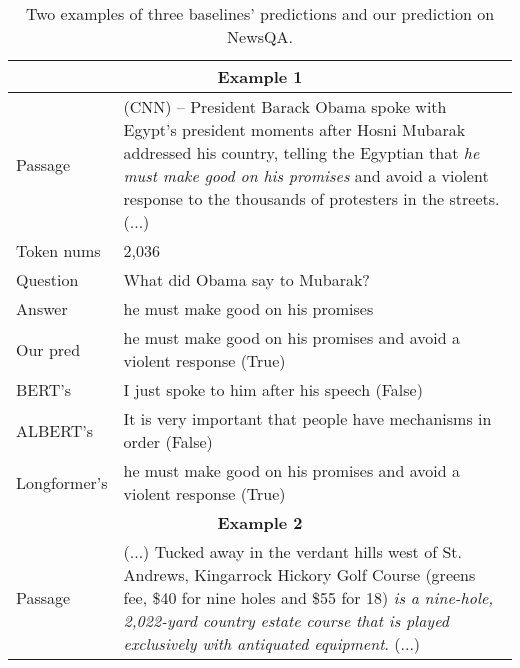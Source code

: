 \begin{table}[]
    \centering
    \caption{Two examples of three baselines' predictions and our prediction on NewsQA.}
    \begin{tabular}{p{56pt}|p{280pt}}
         \hline
         \multicolumn{2}{c}{\bfseries Example 1} \\
         \hline
         Passage & (CNN) -- President Barack Obama spoke with Egypt's president moments after Hosni Mubarak addressed his country, telling the Egyptian that \textcolor[rgb]{1,0,0.2}{\itshape he must make good on his promises} and avoid a violent response to the thousands of protesters in the streets. (...) \\
         \hline
         Token nums & 2,036 \\
         \hline
         Question & What did Obama say to Mubarak? \\
         \hline
         Answer & he must make good on his promises \\
         \hline
         Our pred & \textcolor[rgb]{1,0.4,0.3}{he must make good on his promises and avoid a violent response (True)} \\
         \hline
         BERT's & \textcolor[rgb]{0.4,0.7,0.9}{I just spoke to him after his speech (False)} \\
         \hline
         ALBERT's & \textcolor[rgb]{0.4,0.7,0.9}{It is very important that people have mechanisms in order (False)} \\
         \hline
         Longformer's & \textcolor[rgb]{0.4,0.7,0.9}{he must make good on his promises and avoid a violent response (True)} \\
         \hline
         \hline
         \multicolumn{2}{c}{\bfseries Example 2} \\
         \hline
         Passage & (...) Tucked away in the verdant hills west of St. Andrews, Kingarrock Hickory Golf Course (greens fee, \$40 for nine holes and \$55 for 18) \textcolor[rgb]{1,0,0.2}{\itshape is a nine-hole, 2,022-yard country estate course that is played exclusively with antiquated equipment}. (...) \\

\end{tabular}
\end{table}
